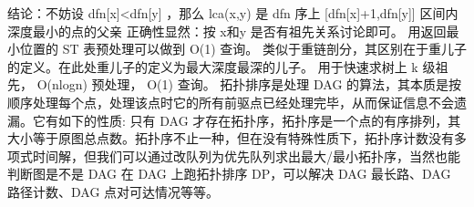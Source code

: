 {}结论：不妨设\markdownRendererDollarSign{} dfn[x]<dfn[y] \markdownRendererDollarSign{}，那么\markdownRendererDollarSign{} lca(x,y) \markdownRendererDollarSign{}是\markdownRendererDollarSign{} dfn \markdownRendererDollarSign{}序上\markdownRendererDollarSign{} [dfn[x]+1,dfn[y]] \markdownRendererDollarSign{}区间内深度最小的点的父亲\markdownRendererParagraphSeparator
{}正确性显然：按\markdownRendererDollarSign{} x和y \markdownRendererDollarSign{}是否有祖先关系讨论即可。\markdownRendererParagraphSeparator
{}用返回最小位置的\markdownRendererDollarSign{} ST \markdownRendererDollarSign{}表预处理可以做到\markdownRendererDollarSign{} O(1) \markdownRendererDollarSign{}查询。\markdownRendererInterblockSeparator
{}\markdownRendererInterblockSeparator
{}
\markdownRendererSectionEnd \markdownRendererSectionBegin
{}\markdownRendererInterblockSeparator
{}类似于重链剖分，其区别在于重儿子的定义。在此处重儿子的定义为最大深度最深的儿子。\markdownRendererParagraphSeparator
{}用于快速求树上\markdownRendererDollarSign{} k \markdownRendererDollarSign{}级祖先，\markdownRendererDollarSign{} O(nlogn) \markdownRendererDollarSign{}预处理，\markdownRendererDollarSign{} O(1) \markdownRendererDollarSign{}查询。\markdownRendererInterblockSeparator
{}\markdownRendererInterblockSeparator
{}
\markdownRendererSectionEnd 
\markdownRendererSectionEnd \markdownRendererSectionBegin
{}\markdownRendererInterblockSeparator
{}拓扑排序是处理\markdownRendererDollarSign{} DAG \markdownRendererDollarSign{}的算法，其本质是按顺序处理每个点，处理该点时它的所有前驱点已经处理完毕，从而保证信息不会遗漏。它有如下的性质:\markdownRendererParagraphSeparator
{}只有\markdownRendererDollarSign{} DAG \markdownRendererDollarSign{}才存在拓扑序，拓扑序是一个点的有序排列，其大小等于原图总点数。拓扑序不止一种，但在没有特殊性质下，拓扑序计数没有多项式时间解，但我们可以通过改队列为优先队列求出最大/最小拓扑序，当然也能判断图是不是\markdownRendererDollarSign{} DAG \markdownRendererDollarSign{}\markdownRendererParagraphSeparator
{}在 \markdownRendererDollarSign{}DAG\markdownRendererDollarSign{} 上跑拓扑排序 \markdownRendererDollarSign{}DP\markdownRendererDollarSign{}，可以解决 \markdownRendererDollarSign{}DAG\markdownRendererDollarSign{} 最长路、\markdownRendererDollarSign{}DAG\markdownRendererDollarSign{} 路径计数、\markdownRendererDollarSign{}DAG\markdownRendererDollarSign{} 点对可达情况等等。\markdownRendererParagraphSeparator
